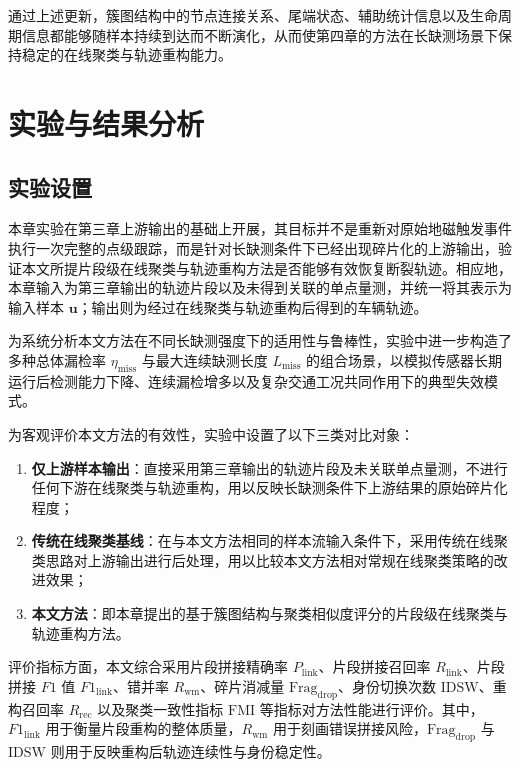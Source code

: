 \documentclass{xdupgthesis}
\begin{document}
通过上述更新，簇图结构中的节点连接关系、尾端状态、辅助统计信息以及生命周期信息都能够随样本持续到达而不断演化，从而使第四章的方法在长缺测场景下保持稳定的在线聚类与轨迹重构能力。

\section{实验与结果分析}

\subsection{实验设置}

本章实验在第三章上游输出的基础上开展，其目标并不是重新对原始地磁触发事件执行一次完整的点级跟踪，而是针对长缺测条件下已经出现碎片化的上游输出，验证本文所提片段级在线聚类与轨迹重构方法是否能够有效恢复断裂轨迹。相应地，本章输入为第三章输出的轨迹片段以及未得到关联的单点量测，并统一将其表示为输入样本 $\mathbf{u}$；输出则为经过在线聚类与轨迹重构后得到的车辆轨迹。

为系统分析本文方法在不同长缺测强度下的适用性与鲁棒性，实验中进一步构造了多种总体漏检率 $\eta_{\mathrm{miss}}$ 与最大连续缺测长度 $L_{\mathrm{miss}}$ 的组合场景，以模拟传感器长期运行后检测能力下降、连续漏检增多以及复杂交通工况共同作用下的典型失效模式。

为客观评价本文方法的有效性，实验中设置了以下三类对比对象：
\begin{enumerate}
	\item \textbf{仅上游样本输出}：直接采用第三章输出的轨迹片段及未关联单点量测，不进行任何下游在线聚类与轨迹重构，用以反映长缺测条件下上游结果的原始碎片化程度；
	\item \textbf{传统在线聚类基线}：在与本文方法相同的样本流输入条件下，采用传统在线聚类思路对上游输出进行后处理，用以比较本文方法相对常规在线聚类策略的改进效果；
	\item \textbf{本文方法}：即本章提出的基于簇图结构与聚类相似度评分的片段级在线聚类与轨迹重构方法。
\end{enumerate}

评价指标方面，本文综合采用片段拼接精确率 $P_{\mathrm{link}}$、片段拼接召回率 $R_{\mathrm{link}}$、片段拼接 $F1$ 值 $F1_{\mathrm{link}}$、错并率 $R_{\mathrm{wm}}$、碎片消减量 $\mathrm{Frag}_{\mathrm{drop}}$、身份切换次数 $\mathrm{IDSW}$、重构召回率 $R_{\mathrm{rec}}$ 以及聚类一致性指标 $\mathrm{FMI}$ 等指标对方法性能进行评价。其中，$F1_{\mathrm{link}}$ 用于衡量片段重构的整体质量，$R_{\mathrm{wm}}$ 用于刻画错误拼接风险，$\mathrm{Frag}_{\mathrm{drop}}$ 与 $\mathrm{IDSW}$ 则用于反映重构后轨迹连续性与身份稳定性。
\end{document}
